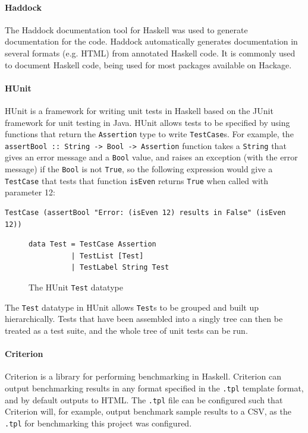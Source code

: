 \documentclass[12pt,a4paper,twoside,openright]{report}
\begin{document}
\paragraph{Haddock}{
The Haddock documentation tool for Haskell was used to generate documentation
for the code. Haddock automatically generates documentation in
several formats (e.g. HTML) from annotated Haskell code. It is commonly
used to document Haskell code, being used for most packages available
on Hackage.
}

\paragraph{HUnit}{
HUnit is a framework for writing unit tests in Haskell based on the JUnit framework
for unit testing in Java. HUnit allows tests to be specified by using functions
that return the \verb,Assertion, type to write \verb,TestCase,s. For example, the
\verb,assertBool :: String -> Bool -> Assertion, function takes a \verb,String,
that gives an error message and a \verb,Bool, value, and raises an exception (with
the error message) if the \verb,Bool, is not \verb,True,, so the following
expression would give a \verb,TestCase, that tests that function
\verb,isEven, returns \verb,True, when called with parameter 12:
\begin{verbatim}
TestCase (assertBool "Error: (isEven 12) results in False" (isEven 12))
\end{verbatim}
\begin{figure}[h]
\centering
\begin{lstlisting}
data Test = TestCase Assertion
          | TestList [Test]
          | TestLabel String Test
\end{lstlisting}
\caption{The HUnit {\tt Test} datatype}
\end{figure}

The \verb,Test, datatype in HUnit allows \verb,Test,s to be grouped
and built up hierarchically. Tests that have been assembled into a
singly tree can then be treated as a test suite, and the whole tree
of unit tests can be run.}

\paragraph{Criterion}{
Criterion is a library for performing benchmarking in Haskell.
Criterion can output benchmarking results in any format specified in the \verb,.tpl,
template format, and by default outputs to HTML.
The \verb,.tpl, file can be configured such that
Criterion will, for example, output benchmark sample results to a CSV, as the
\verb,.tpl, for benchmarking this project was configured.}
\end{document}
